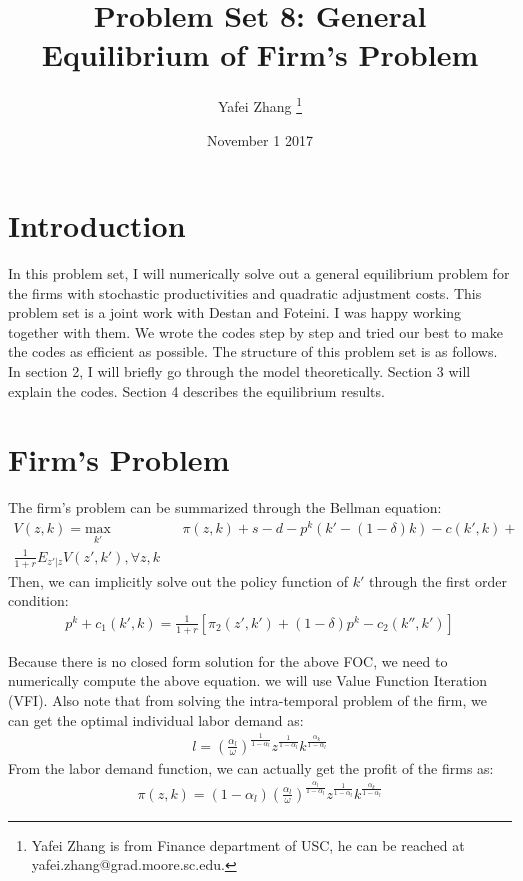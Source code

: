 \documentclass[letterpaper,12pt]{article}
\title{Problem Set 8: General Equilibrium of Firm's Problem}
\author{Yafei Zhang \thanks{Yafei Zhang is from Finance department of USC, he can be reached at yafei.zhang@grad.moore.sc.edu.}}
\date{November 1 2017}
\theoremstyle{definition}
\begin{document}
\maketitle

\vspace{5mm}

\section{Introduction}

In this problem set, I will numerically solve out a general equilibrium problem for the firms with stochastic productivities and quadratic adjustment costs. This problem set is a joint work with Destan and Foteini. I was happy working together with them. We wrote the codes step by step and tried our best to make the codes as efficient as possible. The structure of this problem set is as follows. In section 2, I will briefly go through the model theoretically. Section 3 will explain the codes. Section 4 describes the equilibrium results.


\section{Firm's Problem}

The firm's problem can be summarized through the Bellman equation:
\begin{equation}
\begin{aligned}
V(z, k) = \underset{k'}{\text{max}} && \pi (z,k) + s - d - p^{k}(k' - (1 - \delta )k) - c(k',k) + \\
\frac{1}{1+r} E_{z'|z} V(z',k'), \forall z,k
\end{aligned}
\end{equation}
Then, we can implicitly solve out the policy function of $ k' $ through the first order condition:
\begin{equation}
\begin{aligned}
p^{k} + c_1(k',k) = \frac{1}{1 + r} [\pi_2(z',k') + (1 - \delta)p^{k} - c_2(k'',k')]
\end{aligned}
\end{equation}

Because there is no closed form solution for the above FOC, we need to numerically compute the above equation. we will use Value Function Iteration (VFI). Also note that from solving the intra-temporal problem of the firm, we can get the optimal individual labor demand as:
\begin{equation}
\begin{aligned}
l = (\frac{\alpha_l}{\omega})^{\frac{1}{1 - \alpha_l}}z^{\frac{1}{1 - \alpha_l}}k^{\frac{\alpha_k}{1 - \alpha_l}}
\end{aligned}
\end{equation}
From the labor demand function, we can actually get the profit of the firms as:
\begin{equation}
\begin{aligned}
\pi(z,k) = (1 - \alpha_l)(\frac{\alpha_l}{\omega})^{\frac{\alpha_l}{1 - \alpha_l}}z^{\frac{1}{1 - \alpha_l}}k^{\frac{\alpha_k}{1 - \alpha_l}}
\end{aligned}
\end{equation}
\end{document}
